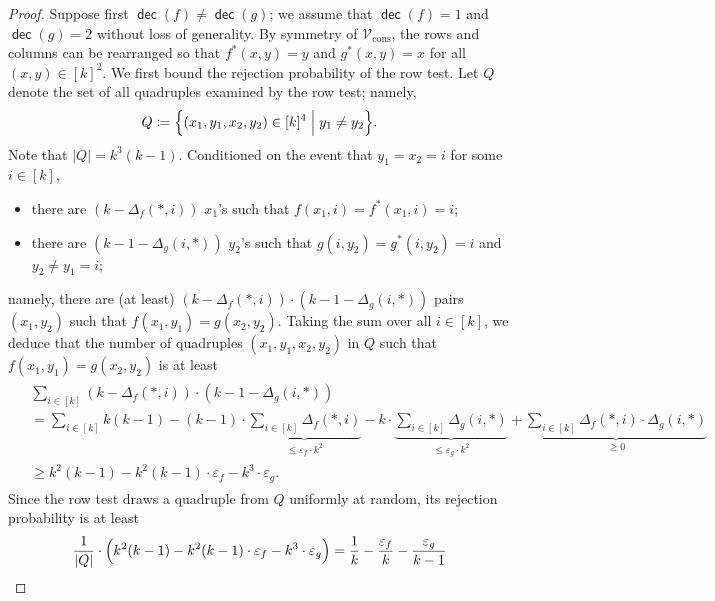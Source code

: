 \documentclass[11pt,fleqn]{article}
\renewcommand{\geq}{\geqslant}
\renewcommand{\leq}{\leqslant}
\renewcommand{\epsilon}{\varepsilon}
\newcommand{\defeq}{\coloneq}
\DeclareMathOperator{\dec}{\mathsf{dec}}
\newcommand{\V}{\calV}
\newcommand{\f}{f}
\newcommand{\g}{g}
\newcommand{\Vcons}{\V_\mathrm{cons}}
\newcommand{\calV}{\mathcal{V}}
\theoremstyle{definition}
\numberwithin{equation}{section}
\begin{document}
\begin{proof}
Suppose first $\dec(\f) \neq \dec(\g)$;
    we assume that
    $\dec(\f)=1$ and
    $\dec(\g)=2$ without loss of generality.
By symmetry of $\Vcons$,
    the rows and columns can be rearranged so that
    $\f^*(x,y) = y$ and 
    $\g^*(x,y) = x$ for all $(x,y) \in [k]^2$.
We first bound the rejection probability of the row test.
Let $Q$ denote the set of all quadruples examined by the row test; namely,
\begin{align}
    Q \defeq \Bigl\{
        (x_1,y_1,x_2,y_2) \in [k]^4 \Bigm| y_1 \neq y_2
    \Bigr\}.
\end{align}
Note that $|Q| = k^3(k-1)$.
Conditioned on the event that $y_1=x_2=i$ for some $i \in [k]$,
\begin{itemize}
    \item there are $(k-\Delta_{\f}(*,i))$ $x_1$'s such that $\f(x_1,i) = \f^*(x_1,i)=i$;
    \item there are $(k-1-\Delta_{\g}(i,*))$ $y_2$'s such that $\g(i,y_2) = \g^*(i,y_2)=i$ and $y_2 \neq y_1 = i$;
\end{itemize}
namely, there are (at least) $(k-\Delta_{\f}(*,i)) \cdot (k-1-\Delta_{\g}(i,*))$ pairs $(x_1,y_2)$ such that
$\f(x_1,y_1) = \g(x_2,y_2)$.
Taking the sum over all $i \in [k]$, we deduce that
    the number of quadruples $(x_1,y_1,x_2,y_2)$ in $Q$ such that
    $\f(x_1,y_1) = \g(x_2,y_2)$ is at least
\begin{align}
\begin{aligned}
    & \sum_{i \in [k]} (k-\Delta_{\f}(*,i)) \cdot (k-1-\Delta_{\g}(i,*)) \\
    & = \sum_{i \in [k]} k(k-1)
        - (k-1) \cdot \underbrace{\sum_{i \in [k]}\Delta_{\f}(*,i)}_{\leq \epsilon_{\f} \cdot k^2}
        - k \cdot \underbrace{\sum_{i \in [k]} \Delta_{\g}(i,*)}_{\leq \epsilon_{\g} \cdot k^2}
        + \underbrace{\sum_{i \in [k]} \Delta_{\f}(*,i) \cdot \Delta_{\g}(i,*)}_{\geq 0} \\
    & \geq k^2(k-1) - k^2(k-1)\cdot\epsilon_{\f} - k^3\cdot\epsilon_{\g}.
\end{aligned}
\end{align}
Since the row test draws a quadruple from $Q$ uniformly at random,
    its rejection probability is at least
\begin{align}
\begin{aligned}
    \frac{1}{|Q|} \cdot \Bigl(
        k^2(k-1) - k^2(k-1)\cdot \epsilon_{\f} - k^3 \cdot \epsilon_{\g}
    \Bigr)
    & = \frac{1}{k} - \frac{\epsilon_{\f}}{k} - \frac{\epsilon_{\g}}{k-1} \\

\end{aligned}
\end{align}
\end{proof}
\end{document}
